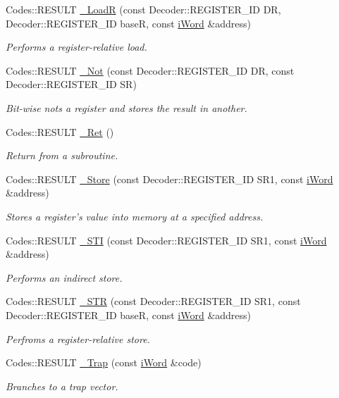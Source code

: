 \begin{DoxyCompactItemize}
Codes::RESULT \hyperlink{classWi11_a58c642a908084d7629c93e702558e05a}{\_\-LoadR} (const Decoder::REGISTER\_\-ID DR, Decoder::REGISTER\_\-ID baseR, const \hyperlink{classiWord}{iWord} \&address)
\begin{DoxyCompactList}\small\item\em Performs a register-\/relative load. \item\end{DoxyCompactList}\item 
Codes::RESULT \hyperlink{classWi11_a13742e76d8e61aa08696459f5bdcaddb}{\_\-Not} (const Decoder::REGISTER\_\-ID DR, const Decoder::REGISTER\_\-ID SR)
\begin{DoxyCompactList}\small\item\em Bit-\/wise nots a register and stores the result in another. \item\end{DoxyCompactList}\item 
Codes::RESULT \hyperlink{classWi11_ad49e98e49ec62664b3684d63568545f0}{\_\-Ret} ()
\begin{DoxyCompactList}\small\item\em Return from a subroutine. \item\end{DoxyCompactList}\item 
Codes::RESULT \hyperlink{classWi11_a35746dfc067eedf054ade3c6aeb13eca}{\_\-Store} (const Decoder::REGISTER\_\-ID SR1, const \hyperlink{classiWord}{iWord} \&address)
\begin{DoxyCompactList}\small\item\em Stores a register's value into memory at a specified address. \item\end{DoxyCompactList}\item 
Codes::RESULT \hyperlink{classWi11_a7b360f2afbe98cd267941d0a8c584260}{\_\-STI} (const Decoder::REGISTER\_\-ID SR1, const \hyperlink{classiWord}{iWord} \&address)
\begin{DoxyCompactList}\small\item\em Performs an indirect store. \item\end{DoxyCompactList}\item 
Codes::RESULT \hyperlink{classWi11_a43d17c3207c05f5519336ff9c2974b2d}{\_\-STR} (const Decoder::REGISTER\_\-ID SR1, const Decoder::REGISTER\_\-ID baseR, const \hyperlink{classiWord}{iWord} \&address)
\begin{DoxyCompactList}\small\item\em Perfroms a register-\/relative store. \item\end{DoxyCompactList}\item 
Codes::RESULT \hyperlink{classWi11_af981c1237ba25082ecd7aee3820d19e3}{\_\-Trap} (const \hyperlink{classiWord}{iWord} \&code)
\begin{DoxyCompactList}\small\item\em Branches to a trap vector. \item\end{DoxyCompactList}\end{DoxyCompactItemize}
